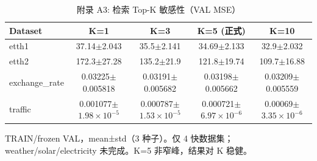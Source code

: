 \begin{table}[htbp]
  \centering
  \caption{附录 A3: 检索 Top-K 敏感性（VAL MSE）}
  \label{tab:appendix_topk}
  \begin{tabular}{lcccc}
    \toprule
    Dataset & K=1 & K=3 & K=5 (正式) & K=10 \\
    \midrule
    etth1 & 37.14$\pm$2.043 & 35.5$\pm$2.141 & 34.69$\pm$2.133 & 32.9$\pm$2.032 \\
    etth2 & 172.3$\pm$27.28 & 135.2$\pm$21.9 & 121.8$\pm$19.74 & 109.7$\pm$16.88 \\
    exchange\_rate & 0.03225$\pm$0.005818 & 0.03191$\pm$0.005682 & 0.03198$\pm$0.005662 & 0.03209$\pm$0.005559 \\
    traffic & 0.001077$\pm$$1.98\times10^{-5}$ & 0.000787$\pm$$1.53\times10^{-5}$ & 0.000721$\pm$$6.97\times10^{-6}$ & 0.00069$\pm$$3.35\times10^{-6}$ \\
    \bottomrule
  \end{tabular}
  {\footnotesize TRAIN/frozen VAL，mean±std（3 种子）。仅 4 快数据集；weather/solar/electricity 未完成。K=5 非窄峰，结果对 K 稳健。}
\end{table}
